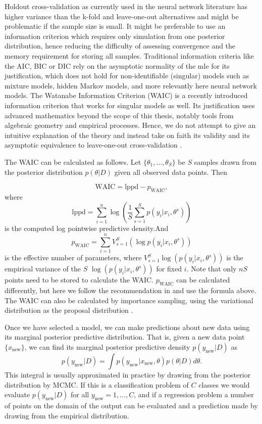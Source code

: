 \documentclass[12pt]{report}
\begin{document}
Holdout cross-validation as currently used in the neural network literature
has higher variance than the k-fold and leave-one-out alternatives and might be
problematic if the sample size is small. It might be
preferable to use an information criterion which requires only simulation from
one posterior distribution, hence reducing the difficulty of assessing convergence and the memory requirement for storing all samples. Traditional information criteria like the
AIC, BIC or DIC rely on the asymptotic normality of the mle for its
justification, which does not hold for non-identifiable (singular) models such
as mixture models, hidden Markov models, and more relevantly here neural network
models. The Watanabe Information Criterion (WAIC) is a recently introduced information criterion that works for
singular models as well. Its justification uses advanced mathematics beyond the
scope of this thesis, notably tools from algebraic geometry and empirical
processes. Hence, we do not attempt to give an intuitive explanation of the
theory and instead take on faith its validity and its asymptotic equivalence to
leave-one-out cross-validation \cite{watanabe2010asymptotic}.

The WAIC can be calculated as follows. Let $\{\theta_1, \dots, \theta_S\}$ be $S$ samples drawn from the posterior distribution $p(\theta|D)$ given all observed data points. Then 

\[\text{WAIC} = \text{lppd} - p_{\text{WAIC}}, \]
where 
\[\text{lppd} = \sum_{i=1}^n \log( \frac{1}{S} \sum_{s=1}^S p(y_i|x_i,\theta^s) ) \]
is the computed log pointwise predictive density.And 
\[p_{\text{WAIC}} = \sum_{i=1}^n V_{s=1}^S(\log p(y_i|x_i, \theta^s)) \]
is the effective number of parameters, where $V_{s=1}^S \log(p(y_i|x_i,\theta^s))$ is the empirical variance of the $S$  $\log(p(y_i|x_i,\theta^s))$ for fixed $i$. Note that only $nS$ points need to be stored to calculate the WAIC. $p_{\text{WAIC}}$ can be calculated differently, but here we follow the recommendation in \cite{gelman2014bayesian} and use the formula above. The WAIC can also be calculated by importance sampling, using the variational distribution as the proposal distribution \cite{yamada2012information}.

Once we have selected a model, we can make predictions about new data using its marginal posterior predictive distribution. That is, given a new data point $\{x_{\text{new}}\}$, we can find its marginal posterior predictive density $p(y_{\text{new}}|D)$ as 
\[ p(y_{\text{new}}|D) = \int p(y_{\text{new}}|x_{\text{new}},\theta) p(\theta|D) d\theta. \]
This integral is usually approximated in practice by drawing from the posterior distribution by MCMC. If this is a classification problem of $C$ classes we would evaluate $p(y_{\text{new}}|D)$ for all $y_{\text{new}}=1,\dots, C$, and if a regression problem a number of points on the domain of the output can be evaluated 
and a prediction made by drawing from the empirical distribution. 
\end{document}
